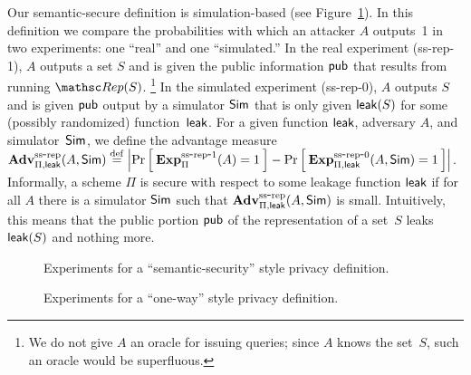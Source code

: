 Our semantic-secure definition is simulation-based (see Figure~\ref{fig:privacy-ss}).
In this definition we compare the probabilities with which an attacker $A$ outputs~1
in two experiments: one ``real'' and one ``simulated.''
In the real experiment (ss-rep-1), $A$ outputs a set $S$  and is given the
public information ${\sf pub}$ that results from running $\Rep(S)$.
\footnote{We do not give $A$ an oracle for issuing queries;
since $A$ knows the set~$S$, such an oracle would be superfluous.
}
In the simulated experiment (ss-rep-0), $A$ outputs $S$ and is given ${\sf pub}$ output
by a simulator ${\sf Sim}$ that is only given ${\sf leak}(S)$ for some (possibly randomized)
function~${\sf leak}$.
For a given function ${\sf leak}$, adversary $A$, and simulator~${\sf Sim}$,
we define the advantage measure
$\mathrm{\mathbf{Adv}}^{\mathrm{ss\mbox{-}rep}}_{\Pi,{\sf leak}}(A,{\sf Sim}) \stackrel{\rm def}{=}
\left| \Pr\left[\: \mathrm{\mathbf{Exp}}^{\mathrm{ss\mbox{-}rep\mbox{-}1}}_{\Pi}(A)=1 \:\right] -
\Pr\left[\: \mathrm{\mathbf{Exp}}^{\mathrm{ss\mbox{-}rep\mbox{-}0}}_{\Pi,{\sf leak}}(A, {\sf Sim})=1 \:\right] \right|$.
Informally, a scheme $\Pi$ is secure with respect to some leakage function ${\sf leak}$
if for all $A$ there is a simulator ${\sf Sim}$ such that
$\mathrm{\mathbf{Adv}}^{\mathrm{ss\mbox{-}rep}}_{\Pi,{\sf leak}}(A,{\sf Sim})$ is small.
Intuitively, this means that the public portion
${\sf pub}$ of the representation of a set~$S$ leaks~${\sf leak}(S)$ and nothing more.
\begin{figure}[hbtp]
\centering
{}
\caption{Experiments for a ``semantic-security'' style privacy
  definition.}
\label{fig:privacy-ss}
\end{figure}

\begin{figure}[hbtp]
\centering
{}
\caption{Experiments for a ``one-way'' style privacy
  definition.}
\label{fig:privacy-ow}
\end{figure}

